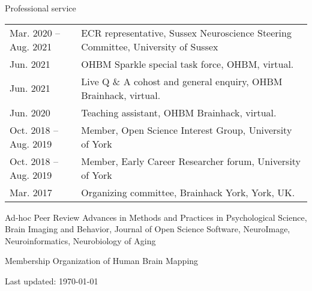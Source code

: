 \documentclass{resume} %
\begin{document}
\begin{rSection}{Professional service}
\begin{tabular}{@{} l l @{\hspace{6ex}}}
  Mar. 2020 -- Aug. 2021 & ECR representative, Sussex Neuroscience Steering Committee, University of Sussex\\
  Jun. 2021 & OHBM Sparkle special task force, OHBM, virtual. \\
  Jun. 2021 & Live Q \& A cohost and general enquiry, OHBM Brainhack, virtual. \\
  Jun. 2020 & Teaching assistant, OHBM Brainhack, virtual. \\
  Oct. 2018 -- Aug. 2019 & Member, Open Science Interest Group, University of York\\
  Oct. 2018 -- Aug. 2019 & Member, Early Career Researcher forum, University of York\\
  Mar. 2017 & Organizing committee, Brainhack York, York, UK.\\
\end{tabular}
\end{rSection}

\begin{rSection}{Ad-hoc Peer Review}
Advances in Methods and Practices in Psychological Science,
Brain Imaging and Behavior,
Journal of Open Science Software,
NeuroImage,
Neuroinformatics,
Neurobiology of Aging
\end{rSection}

\begin{rSection}{Membership}
Organization of Human Brain Mapping
\end{rSection}





\sectionskip
\centering
Last updated: \today
\end{document}
